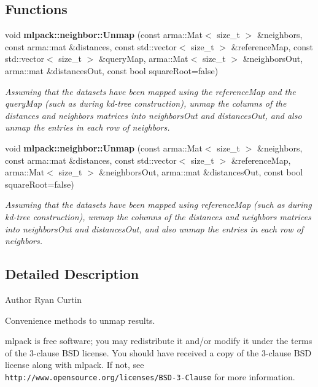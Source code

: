 \subsection*{Functions}
\begin{DoxyCompactItemize}
\item 
void {\bf mlpack\+::neighbor\+::\+Unmap} (const arma\+::\+Mat$<$ size\+\_\+t $>$ \&neighbors, const arma\+::mat \&distances, const std\+::vector$<$ size\+\_\+t $>$ \&reference\+Map, const std\+::vector$<$ size\+\_\+t $>$ \&query\+Map, arma\+::\+Mat$<$ size\+\_\+t $>$ \&neighbors\+Out, arma\+::mat \&distances\+Out, const bool square\+Root=false)
\begin{DoxyCompactList}\small\item\em Assuming that the datasets have been mapped using the reference\+Map and the query\+Map (such as during kd-\/tree construction), unmap the columns of the distances and neighbors matrices into neighbors\+Out and distances\+Out, and also unmap the entries in each row of neighbors. \end{DoxyCompactList}\item 
void {\bf mlpack\+::neighbor\+::\+Unmap} (const arma\+::\+Mat$<$ size\+\_\+t $>$ \&neighbors, const arma\+::mat \&distances, const std\+::vector$<$ size\+\_\+t $>$ \&reference\+Map, arma\+::\+Mat$<$ size\+\_\+t $>$ \&neighbors\+Out, arma\+::mat \&distances\+Out, const bool square\+Root=false)
\begin{DoxyCompactList}\small\item\em Assuming that the datasets have been mapped using reference\+Map (such as during kd-\/tree construction), unmap the columns of the distances and neighbors matrices into neighbors\+Out and distances\+Out, and also unmap the entries in each row of neighbors. \end{DoxyCompactList}\end{DoxyCompactItemize}


\subsection{Detailed Description}
\begin{DoxyAuthor}{Author}
Ryan Curtin
\end{DoxyAuthor}
Convenience methods to unmap results.

mlpack is free software; you may redistribute it and/or modify it under the terms of the 3-\/clause B\+SD license. You should have received a copy of the 3-\/clause B\+SD license along with mlpack. If not, see {\tt http\+://www.\+opensource.\+org/licenses/\+B\+S\+D-\/3-\/\+Clause} for more information. 